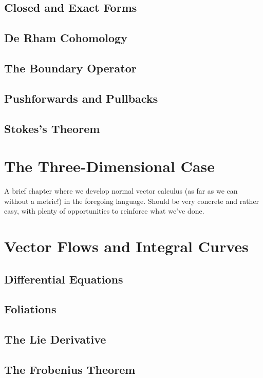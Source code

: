 \documentclass[oneside,english]{amsbook}
\numberwithin{section}{chapter}
\theoremstyle{plain}
\theoremstyle{definition}
\begin{document}
		\section{Closed and Exact Forms}
		\section{De Rham Cohomology}
		\section{The Boundary Operator}

		\section{Pushforwards and Pullbacks}
		\section{Stokes's Theorem}

	\chapter{The Three-Dimensional Case}
	
		A brief chapter where we develop normal vector calculus (as far as we can without a metric!) in the foregoing language. Should be very concrete and rather easy, with plenty of opportunities to reinforce what we've done.

	\chapter{Vector Flows and Integral Curves}
	
		\section{Differential Equations}

		\section{Foliations}

		\section{The Lie Derivative}
	
		\section{The Frobenius Theorem}
\end{document}
